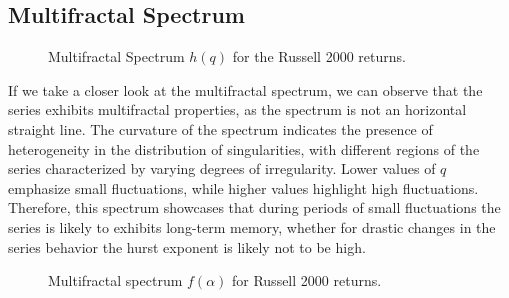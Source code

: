\documentclass[11pt]{extarticle}
\begin{document}
\subsection{Multifractal Spectrum}

\begin{figure}[htbp]
    \centering
    \caption{Multifractal Spectrum $h(q)$ for the Russell 2000 returns.}
\end{figure}

\FloatBarrier

If we take a closer look at the multifractal spectrum, we can observe that the series exhibits multifractal properties, as the spectrum is not an horizontal straight line.
The curvature of the spectrum indicates the presence of heterogeneity in the distribution of singularities, with different regions of the series characterized by varying degrees of irregularity.
Lower values of $q$ emphasize small fluctuations, while higher values highlight high fluctuations.
Therefore, this spectrum showcases that during periods of small fluctuations the series is likely to exhibits long-term memory,
whether for drastic changes in the series behavior the hurst exponent is likely not to be high.

\begin{figure}[htbp]
    \centering
    \caption{Multifractal spectrum $f(\alpha)$ for Russell 2000 returns.}
\end{figure}
\end{document}

